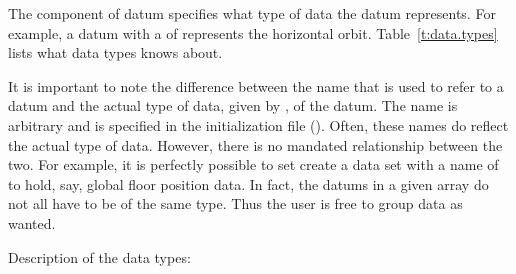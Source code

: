 The  component of datum specifies what type of data the datum represents. For example,
a datum with a  of  represents the horizontal
orbit. Table~\ref{t:data.types} lists what data types \tao knows about.

It is important to note the difference between the  name that is used to refer to a datum
and the actual type of data, given by , of the datum. The  name is arbitrary
and is specified in the \tao initialization file (). Often, these names do reflect
the actual type of data. However, there is no mandated relationship between the two. For example, it
is perfectly possible to set create a data set with a  name of  to hold, say,
global floor position data. In fact, the datums in a given  array do not all have to be of
the same type. Thus the user is free to group data as wanted.

Description of the data types:


